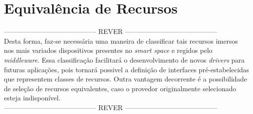 \section{Equivalência de Recursos}

----------------------------------------- REVER ----------------------------------------- \\
Desta forma, faz-se necessária uma maneira de classificar tais recursos imersos nos mais variados dispositivos presentes no \emph{smart space} e regidos pelo \emph{middleware}. Essa classificação facilitará o desenvolvimento de novos \emph{drivers} para futuras aplicações, pois tornará possivel a definição de interfaces pré-estabelecidas que representem classes de recursos. Outra vantagem decorrente é a possibilidade de seleção de recursos equivalentes, caso o provedor originalmente selecionado esteja indisponível. \\
----------------------------------------- REVER -----------------------------------------
